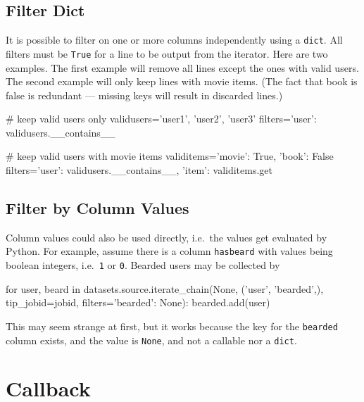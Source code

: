 \subsection*{Filter Dict}

It is possible to filter on one or more columns independently using a
\texttt{dict}.  All filters must be \texttt{True} for a line to be
output from the iterator.  Here are two examples.  The first example
will remove all lines except the ones with valid users.  The second
example will only keep lines with movie items.  (The fact that book is
false is redundant --- missing keys will result in discarded lines.)

\begin{python}
# keep valid users only
validusers={'user1', 'user2', 'user3'}
filters={'user': validusers.__contains__}

# keep valid users with movie items
validitems={'movie': True, 'book': False}
filters={'user': validusers.__contains__, 'item': validitems.get}
\end{python}




\subsection*{Filter by Column Values}


Column values could also be used directly, i.e.\ the values get
evaluated by Python.  For example, assume there is a column
\texttt{hasbeard} with values being boolean integers, i.e.\ \texttt{1}
or \texttt{0}.  Bearded users may be collected by
\begin{python}
for user, beard in datasets.source.iterate_chain(None, ('user', 'bearded',), tip_jobid=jobid,
                                       filters={'bearded': None}):
    bearded.add(user)
\end{python}
This may seem strange at first, but it works because the key
for the \texttt{bearded} column exists, and the value is
\texttt{None}, and not a callable nor a \texttt{dict}.





    


\section{Callback}
\label{sec:callback}

